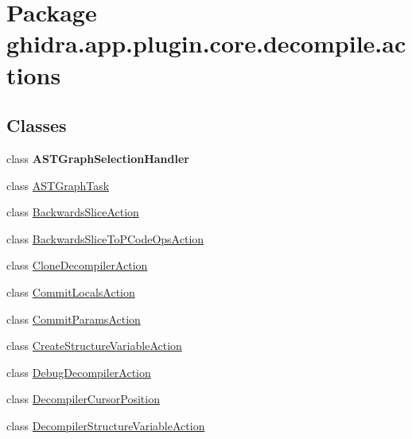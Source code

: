 \hypertarget{namespaceghidra_1_1app_1_1plugin_1_1core_1_1decompile_1_1actions}{}\section{Package ghidra.\+app.\+plugin.\+core.\+decompile.\+actions}
\label{namespaceghidra_1_1app_1_1plugin_1_1core_1_1decompile_1_1actions}
\subsection*{Classes}
\begin{DoxyCompactItemize}
\item 
class {\bfseries A\+S\+T\+Graph\+Selection\+Handler}
\item 
class \mbox{\hyperlink{classghidra_1_1app_1_1plugin_1_1core_1_1decompile_1_1actions_1_1_a_s_t_graph_task}{A\+S\+T\+Graph\+Task}}
\item 
class \mbox{\hyperlink{classghidra_1_1app_1_1plugin_1_1core_1_1decompile_1_1actions_1_1_backwards_slice_action}{Backwards\+Slice\+Action}}
\item 
class \mbox{\hyperlink{classghidra_1_1app_1_1plugin_1_1core_1_1decompile_1_1actions_1_1_backwards_slice_to_p_code_ops_action}{Backwards\+Slice\+To\+P\+Code\+Ops\+Action}}
\item 
class \mbox{\hyperlink{classghidra_1_1app_1_1plugin_1_1core_1_1decompile_1_1actions_1_1_clone_decompiler_action}{Clone\+Decompiler\+Action}}
\item 
class \mbox{\hyperlink{classghidra_1_1app_1_1plugin_1_1core_1_1decompile_1_1actions_1_1_commit_locals_action}{Commit\+Locals\+Action}}
\item 
class \mbox{\hyperlink{classghidra_1_1app_1_1plugin_1_1core_1_1decompile_1_1actions_1_1_commit_params_action}{Commit\+Params\+Action}}
\item 
class \mbox{\hyperlink{classghidra_1_1app_1_1plugin_1_1core_1_1decompile_1_1actions_1_1_create_structure_variable_action}{Create\+Structure\+Variable\+Action}}
\item 
class \mbox{\hyperlink{classghidra_1_1app_1_1plugin_1_1core_1_1decompile_1_1actions_1_1_debug_decompiler_action}{Debug\+Decompiler\+Action}}
\item 
class \mbox{\hyperlink{classghidra_1_1app_1_1plugin_1_1core_1_1decompile_1_1actions_1_1_decompiler_cursor_position}{Decompiler\+Cursor\+Position}}
\item 
class \mbox{\hyperlink{classghidra_1_1app_1_1plugin_1_1core_1_1decompile_1_1actions_1_1_decompiler_structure_variable_action}{Decompiler\+Structure\+Variable\+Action}}

\end{DoxyCompactItemize}

